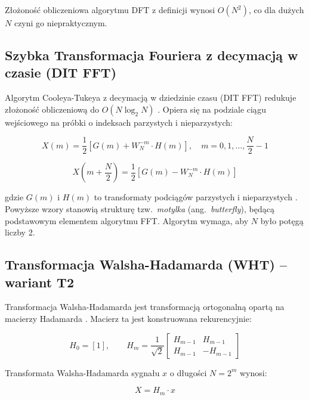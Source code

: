 \documentclass[12pt]{article}
\begin{document}
Złożoność obliczeniowa algorytmu DFT z definicji wynosi $O(N^2)$, co dla dużych $N$ czyni go niepraktycznym.

\subsection{Szybka Transformacja Fouriera z decymacją w czasie (DIT FFT)}

Algorytm Cooleya-Tukeya z decymacją w dziedzinie czasu (DIT FFT) redukuje złożoność obliczeniową do $O(N \log_2 N)$ \cite{1}. Opiera się na podziale ciągu wejściowego na próbki o indeksach parzystych i nieparzystych:

\begin{equation}
    X(m) = \frac{1}{2}\left[ G(m) + W_N^{-m} \cdot H(m) \right], \quad m = 0, 1, \dots, \frac{N}{2}-1
    \label{eq:fft_upper}
\end{equation}

\begin{equation}
    X\!\left(m + \frac{N}{2}\right) = \frac{1}{2}\left[ G(m) - W_N^{-m} \cdot H(m) \right]
    \label{eq:fft_lower}
\end{equation}

gdzie $G(m)$ i $H(m)$ to transformaty podciągów parzystych i nieparzystych \cite{1}. Powyższe wzory stanowią strukturę tzw.~\textit{motylka} (ang.~\textit{butterfly}), będącą podstawowym elementem algorytmu FFT. Algorytm wymaga, aby $N$ było potęgą liczby 2.

\subsection{Transformacja Walsha-Hadamarda (WHT) -- wariant T2}

Transformacja Walsha-Hadamarda jest transformacją ortogonalną opartą na macierzy Hadamarda \cite{1}. Macierz ta jest konstruowana rekurencyjnie:

\begin{equation}
    H_0 = [1], \qquad H_m = \frac{1}{\sqrt{2}} \begin{bmatrix} H_{m-1} & H_{m-1} \\ H_{m-1} & -H_{m-1} \end{bmatrix}
    \label{eq:hadamard}
\end{equation}

Transformata Walsha-Hadamarda sygnału $x$ o długości $N = 2^m$ wynosi:

\begin{equation}
    X = H_m \cdot x
    \label{eq:wht}
\end{equation}
\end{document}
